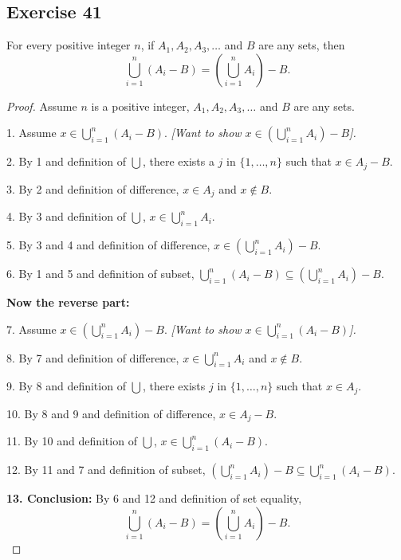 \documentclass[14pt]{extarticle}
\newcommand{\dps}{\displaystyle}
\begin{document}
\subsection{Exercise 41}
For every positive integer $n$, if \(A_1, A_2, A_3, \ldots\) and $B$ are any sets, then
\[
  \bigcup_{i=1}^n (A_i - B) = \left(\bigcup_{i=1}^n A_i\right) - B.
\]
\begin{proof}
  Assume $n$ is a positive integer, \(A_1, A_2, A_3, \ldots\) and $B$ are any sets.

  1. Assume \(\dps x \in \bigcup_{i=1}^n (A_i - B)\). {\it [Want to show \(\dps x \in \left(\bigcup_{i=1}^n A_i\right) - B\)].}

  2. By 1 and definition of \(\dps \bigcup\), there exists a $j$ in \(\{1, \ldots, n\}\) such that \(x \in A_j - B\).

  3. By 2 and definition of difference, \(x \in A_j\) and \(x \notin B\).

  4. By 3 and definition of $\dps \bigcup$, \(\dps x \in \bigcup_{i=1}^n A_i\).

  5. By 3 and 4 and definition of difference, \(\dps x \in \left(\bigcup_{i=1}^n A_i\right) - B\).

  6. By 1 and 5 and definition of subset, \(\dps \bigcup_ {i=1}^n (A_i - B) \subseteq \left(\bigcup_{i=1}^n A_i\right) - B.\)

  {\bf Now the reverse part:}

  7. Assume \(\dps x \in \left(\bigcup_{i=1}^n A_i\right) - B\). {\it [Want to show \(\dps x \in \bigcup_{i=1}^n (A_i - B)\)].}

  8. By 7 and definition of difference, \(\dps x \in \bigcup_{i=1}^n A_i\) and \(x \notin B\).

  9. By 8 and definition of $\dps \bigcup$, there exists $j$ in \(\{1, \ldots, n\}\) such that \(x \in A_j\).

  10. By 8 and 9 and definition of difference, \(x \in A_j - B\).

  11. By 10 and definition of $\dps \bigcup$, \(x \in \dps \bigcup_{i=1}^n (A_i - B)\).

  12. By 11 and 7 and definition of subset, \(\dps \left( \bigcup_{i=1}^n A_i\right) - B \subseteq \bigcup_{i=1}^n (A_i - B)\).

    {\bf 13. Conclusion:} By 6 and 12 and definition of set equality,
  \[
    \bigcup_{i=1}^n (A_i - B) = \left(\bigcup_{i=1}^n A_i\right) - B.
  \]
\end{proof}
\end{document}
